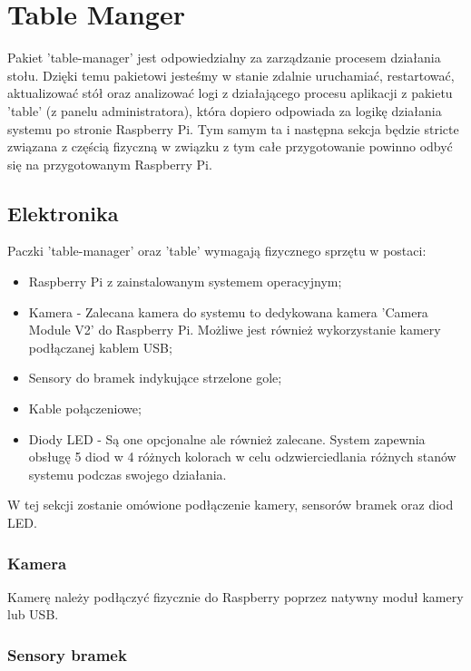 \section{Table Manger}
Pakiet 'table-manager' jest odpowiedzialny za zarządzanie procesem działania stołu. Dzięki temu pakietowi jesteśmy w stanie zdalnie uruchamiać, restartować, aktualizować stół oraz analizować logi z działającego procesu aplikacji z pakietu 'table' (z panelu administratora), która dopiero odpowiada za logikę działania systemu po stronie Raspberry Pi. Tym samym ta i następna sekcja będzie stricte związana z częścią fizyczną w związku z tym całe przygotowanie powinno odbyć się na przygotowanym Raspberry Pi.

\subsection{Elektronika}

Paczki 'table-manager' oraz 'table' wymagają fizycznego sprzętu w postaci:

\begin{itemize}
	\item Raspberry Pi z zainstalowanym systemem operacyjnym;
	\item Kamera - Zalecana kamera do systemu to dedykowana kamera 'Camera Module V2' do Raspberry Pi. Możliwe jest również wykorzystanie kamery podłączanej kablem USB;
	\item Sensory do bramek indykujące strzelone gole;
	\item Kable połączeniowe;
	\item Diody LED - Są one opcjonalne ale również zalecane. System zapewnia obsługę 5 diod w 4 różnych kolorach w celu odzwierciedlania różnych stanów systemu podczas swojego działania.
\end{itemize}

W tej sekcji zostanie omówione podłączenie kamery, sensorów bramek oraz diod LED.

\subsubsection{Kamera}

Kamerę należy podłączyć fizycznie do Raspberry poprzez natywny moduł kamery lub USB.

\subsubsection{Sensory bramek}

